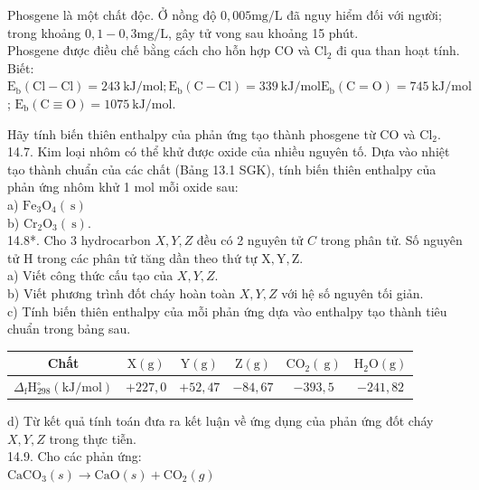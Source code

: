 \documentclass[10pt]{article}
\begin{document}
Phosgene là một chất độc. Ở nồng độ $0,005 \mathrm{mg} / \mathrm{L}$ đã nguy hiểm đối với người; trong khoảng $0,1-0,3 \mathrm{mg} / \mathrm{L}$, gây tử vong sau khoảng 15 phút.\\
Phosgene được điều chế bằng cách cho hỗn hợp CO và $\mathrm{Cl}_{2}$ đi qua than hoạt tính. Biết: $\mathrm{E}_{\mathrm{b}}(\mathrm{Cl}-\mathrm{Cl})=243 \mathrm{~kJ} / \mathrm{mol} ; \mathrm{E}_{\mathrm{b}}(\mathrm{C}-\mathrm{Cl})=339 \mathrm{~kJ} / \mathrm{mol} \mathrm{E}_{\mathrm{b}}(\mathrm{C}=\mathrm{O})=745 \mathrm{~kJ} / \mathrm{mol}$; $\mathrm{E}_{\mathrm{b}}(\mathrm{C} \equiv \mathrm{O})=1075 \mathrm{~kJ} / \mathrm{mol}$.

Hãy tính biến thiên enthalpy của phản ứng tạo thành phosgene từ CO và $\mathrm{Cl}_{2}$.\\
14.7. Kim loại nhôm có thể khử được oxide của nhiều nguyên tố. Dựa vào nhiệt tạo thành chuẩn của các chất (Bảng 13.1 SGK), tính biến thiên enthalpy của phản ứng nhôm khử 1 mol mỗi oxide sau:\\
a) $\mathrm{Fe}_{3} \mathrm{O}_{4}(\mathrm{~s})$\\
b) $\mathrm{Cr}_{2} \mathrm{O}_{3}(\mathrm{~s})$.\\
14.8*. Cho 3 hydrocarbon $X, Y, Z$ đều có 2 nguyên tử $C$ trong phân tử. Số nguyên tử H trong các phân tử tăng dần theo thứ tự $\mathrm{X}, \mathrm{Y}, \mathrm{Z}$.\\
a) Viết công thức cấu tạo của $X, Y, Z$.\\
b) Viết phương trình đốt cháy hoàn toàn $X, Y, Z$ với hệ số nguyên tối giản.\\
c) Tính biến thiên enthalpy của mỗi phản ứng dựa vào enthalpy tạo thành tiêu chuẩn trong bảng sau.

\begin{center}
\begin{tabular}{|c|c|c|c|c|c|}
\hline
Chất & $\mathrm{X}(\mathrm{g})$ & $\mathrm{Y}(\mathrm{g})$ & $\mathrm{Z}(\mathrm{g})$ & $\mathrm{CO}_{2}(\mathrm{~g})$ & $\mathrm{H}_{2} \mathrm{O}(\mathrm{g})$ \\
\hline
$\Delta_{\mathrm{f}} \mathrm{H}_{298}^{\circ}(\mathrm{kJ} / \mathrm{mol})$ & $+227,0$ & $+52,47$ & $-84,67$ & $-393,5$ & $-241,82$ \\
\hline
\end{tabular}
\end{center}

d) Từ kết quả tính toán đưa ra kết luận về ứng dụng của phản ứng đốt cháy $X, Y, Z$ trong thực tiễn.\\
14.9. Cho các phản ứng:\\
$\mathrm{CaCO}_{3}(s) \rightarrow \mathrm{CaO}(s)+\mathrm{CO}_{2}(g)$
\end{document}

